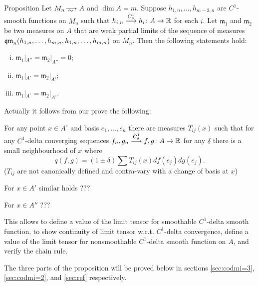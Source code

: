 \begin{thm}{Proposition}\label{prop:3parts}
Let $M_n\smooths{} A$ and $\dim A=m$.
Suppose $h_{1,n},\dots, h_{m-2,n}$ are 
$C^1$-smooth functions on $M_n$ 
such that $h_{i,n}\zz\smoothto  h_i\:A\to \RR$ for each $i$.
Let $\mathfrak m_1$ and $\mathfrak m_2$ be two measures on $A$ that are weak partial limits of the sequence of measures $\qm_n( h_{1,n},\zz\dots,  h_{m,n}, h_{1,n},\zz\dots,  h_{m,n})$ on $M_n$.
Then the following statements hold:
\begin{enumerate}[(i)]
\item\label{prop:3parts:codim3} $\mathfrak m_1|_{A''}=\mathfrak m_2|_{A''}=0$;

\item\label{prop:3parts:codim2} $\mathfrak m_1|_{A'}=\mathfrak m_2|_{A'}$;

\item\label{prop:3parts:reg} $\mathfrak m_1|_{A^\circ}=\mathfrak m_2|_{A^\circ}$.
\end{enumerate}
\end{thm}
{\color{blue}
Actually it follows from our  prove the following:


For any point $x\in A^\circ$
and basis $e_1,\dots, e_n$
there are measures
$T_{ij}(x)$ such that
for any $C^1$-delta converging sequences
$f_{n}, g_n\zz\smoothto  f,g\:A\to \RR$
for any $\delta$
there is a small neighbourhood of $x$ where
$$q(f,g)=(1\pm \delta)\sum T_{ij}(x)df(e_j)dg(e_j).$$ ($T_{ij}$ are
not canonically defined and contra-vary with a change of basis at $x$) 

For $x\in A'$ similar holds ???

For $x\in A''$  ???

This allows to define a value of the limit 
tensor for smoothable $C^1$-delta smooth
function,
to show continuity of limit tensor w.r.t.
$C^1$-delta convergence,
 define a value of the limit 
tensor for nonsmoothable $C^1$-delta smooth
function on $A$, and verify
the chain rule.







}
The three parts of the proposition will be proved below in sections \ref{sec:codmi=3}, \ref{sec:codmi=2}, and \ref{sec:ref} respectively.
